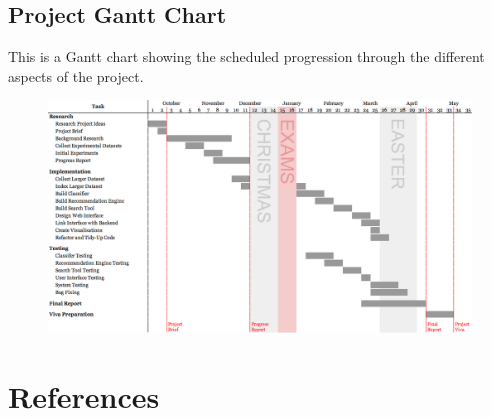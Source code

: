 \documentclass[12pt,a4paper]{article}
\begin{document}
\begin{landscape}
    \appendix
    \section{Project Gantt Chart}
    \label{appendix:gantt}
    This is a Gantt chart showing the scheduled progression through the different aspects of the project.

    \begin{figure}[H]
        \centering
        \includegraphics[height=0.85\textwidth]{gantt.png}
    \end{figure}
\end{landscape}

\setcounter{secnumdepth}{0}
\section{References}
{\footnotesize \printbibliography[heading=none]}
\end{document}
